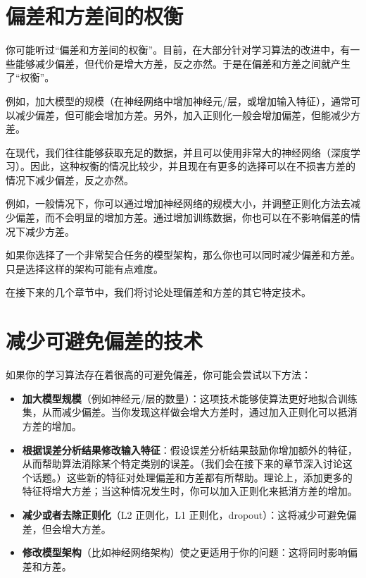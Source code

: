 \hypertarget{ux504fux5deeux548cux65b9ux5deeux95f4ux7684ux6743ux8861}{%
\chapter{偏差和方差间的权衡}\label{ux504fux5deeux548cux65b9ux5deeux95f4ux7684ux6743ux8861}}

你可能听过``偏差和方差间的权衡''。目前，在大部分针对学习算法的改进中，有一些能够减少偏差，但代价是增大方差，反之亦然。于是在偏差和方差之间就产生了``权衡''。

例如，加大模型的规模（在神经网络中增加神经元/层，或增加输入特征），通常可以减少偏差，但可能会增加方差。另外，加入正则化一般会增加偏差，但能减少方差。

在现代，我们往往能够获取充足的数据，并且可以使用非常大的神经网络（深度学习）。因此，这种权衡的情况比较少，并且现在有更多的选择可以在不损害方差的情况下减少偏差，反之亦然。

例如，一般情况下，你可以通过增加神经网络的规模大小，并调整正则化方法去减少偏差，而不会明显的增加方差。通过增加训练数据，你也可以在不影响偏差的情况下减少方差。

如果你选择了一个非常契合任务的模型架构，那么你也可以同时减少偏差和方差。只是选择这样的架构可能有点难度。

在接下来的几个章节中，我们将讨论处理偏差和方差的其它特定技术。

\hypertarget{ux51cfux5c11ux53efux907fux514dux504fux5deeux7684ux6280ux672f}{%
\chapter{减少可避免偏差的技术}\label{ux51cfux5c11ux53efux907fux514dux504fux5deeux7684ux6280ux672f}}

如果你的学习算法存在着很高的可避免偏差，你可能会尝试以下方法：

\begin{itemize}
\tightlist
\item
  \textbf{加大模型规模}（例如神经元/层的数量）：这项技术能够使算法更好地拟合训练集，从而减少偏差。当你发现这样做会增大方差时，通过加入正则化可以抵消方差的增加。
\item
  \textbf{根据误差分析结果修改输入特征}：假设误差分析结果鼓励你增加额外的特征，从而帮助算法消除某个特定类别的误差。（我们会在接下来的章节深入讨论这个话题。）这些新的特征对处理偏差和方差都有所帮助。理论上，添加更多的特征将增大方差；当这种情况发生时，你可以加入正则化来抵消方差的增加。
\item
  \textbf{减少或者去除正则化}（L2 正则化，L1
  正则化，dropout）：这将减少可避免偏差，但会增大方差。
\item
  \textbf{修改模型架构}（比如神经网络架构）使之更适用于你的问题：这将同时影响偏差和方差。
\end{itemize}

